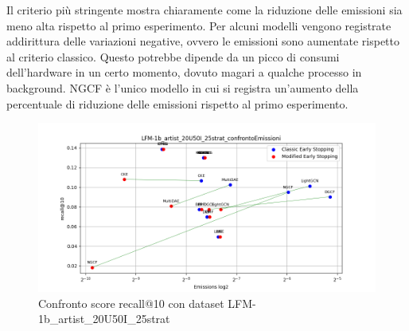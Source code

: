 \begin{table}[H]
    \centering
    \caption{Confronto delle emissioni}
\end{table}

\noindent Il criterio più stringente mostra chiaramente come la riduzione delle emissioni sia meno alta rispetto al primo esperimento.
Per alcuni modelli vengono registrate addirittura delle variazioni negative, ovvero le emissioni sono aumentate rispetto al criterio classico. Questo potrebbe dipende da un picco di consumi dell'hardware in un certo momento, dovuto magari a qualche processo in background.
NGCF è l'unico modello in cui si registra un'aumento della percentuale di riduzione delle emissioni rispetto al primo esperimento.


\begin{figure}[H]
    \centering
    \includegraphics[width=\linewidth, trim=0 0 0 0]{images/recall@10_LFM-1b_artist_20U50I_25strat_comparison.png}
    \caption{Confronto score recall@10 con dataset LFM-1b\_artist\_20U50I\_25strat}
    
\end{figure}


